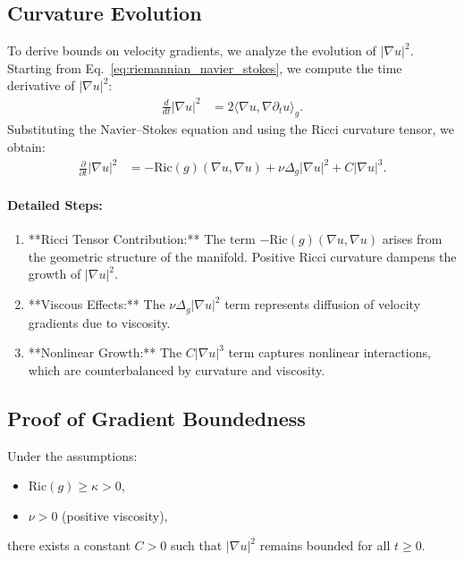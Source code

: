 \subsection{Curvature Evolution}
To derive bounds on velocity gradients, we analyze the evolution of $|\nabla u|^2$. Starting from Eq.~\eqref{eq:riemannian_navier_stokes}, we compute the time derivative of $|\nabla u|^2$:
\begin{align}
\frac{d}{dt} |\nabla u|^2 &= 2 \langle \nabla u, \nabla \partial_t u \rangle_g. \label{eq:gradient_time_evolution}
\end{align}
Substituting the Navier--Stokes equation and using the Ricci curvature tensor, we obtain:
\begin{align}
\frac{\partial}{\partial t} |\nabla u|^2 &= - \text{Ric}(g)(\nabla u, \nabla u) + \nu \Delta_g |\nabla u|^2 + C |\nabla u|^3. \label{eq:ricci_curvature_evolution}
\end{align}

\paragraph{Detailed Steps:}
\begin{enumerate}
    \item **Ricci Tensor Contribution:**
    The term $- \text{Ric}(g)(\nabla u, \nabla u)$ arises from the geometric structure of the manifold. Positive Ricci curvature dampens the growth of $|\nabla u|^2$.
    \item **Viscous Effects:**
    The $\nu \Delta_g |\nabla u|^2$ term represents diffusion of velocity gradients due to viscosity.
    \item **Nonlinear Growth:**
    The $C |\nabla u|^3$ term captures nonlinear interactions, which are counterbalanced by curvature and viscosity.
\end{enumerate}

\subsection{Proof of Gradient Boundedness}
\begin{theorem}
Under the assumptions:
\begin{itemize}
    \item $\text{Ric}(g) \geq \kappa > 0$,
    \item $\nu > 0$ (positive viscosity),
\end{itemize}
there exists a constant $C > 0$ such that $|\nabla u|^2$ remains bounded for all $t \geq 0$.
\end{theorem}

